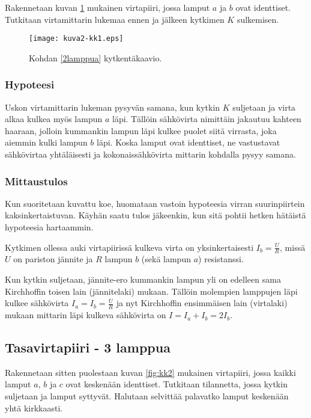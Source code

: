 \documentclass[a4paper,11pt]{article}
\begin{document}
{Rakennetaan kuvan \ref{fig:kk1} mukainen virtapiiri, jossa lamput $a$ ja $b$ ovat identtiset. Tutkitaan virtamittarin lukemaa ennen ja jälkeen kytkimen $K$ sulkemisen.

\begin{figure}[!htb]
    \centering
    \texttt{[image: kuva2-kk1.eps]}
    \caption{Kohdan \ref{2lamppua} kytkentäkaavio.}
    \label{fig:kk1}
\end{figure}

\subsubsection{Hypoteesi}

Uskon virtamittarin lukeman pysyvän samana, kun kytkin $K$ suljetaan ja virta alkaa kulkea myös lampun $a$ läpi. Tällöin sähkövirta nimittäin jakautuu kahteen haaraan, jolloin kummankin lampun läpi kulkee puolet siitä virrasta, joka aiemmin kulki lampun $b$ läpi. Koska lamput ovat identtiset, ne vastustavat sähkövirtaa yhtäläisesti ja kokonaissähkövirta mittarin kohdalla pysyy samana.

\subsubsection{Mittaustulos}

Kun suoritetaan kuvattu koe, huomataan vastoin hypoteesia virran suurinpiirtein kaksinkertaistuvan. Käyhän saatu tulos jäkeenkin, kun sitä pohtii hetken hätäistä hypoteesia hartaammin.

Kytkimen ollessa auki virtapiirissä kulkeva virta on yksinkertaisesti $I_b=\frac{U}{R}$, missä $U$ on pariston jännite ja $R$ lampun $b$ (sekä lampun $a$) resistanssi.

Kun kytkin suljetaan, jännite-ero kummankin lampun yli on edelleen sama Kirchhoffin toisen lain (jännitelaki) mukaan. Tällöin molempien lamppujen läpi kulkee sähkövirta $I_a=I_b=\frac{U}{R}$ ja nyt Kirchhoffin ensimmäisen lain (virtalaki) mukaan mittarin läpi kulkeva sähkövirta on $I=I_a+I_b=2I_b$.

\subsection{Tasavirtapiiri - 3 lamppua}
\label{3lamppua}

Rakennetaan sitten puolestaan kuvan \ref{fig:kk2} mukainen virtapiiri, jossa kaikki lamput $a$, $b$ ja $c$ ovat keskenään identtiset. Tutkitaan tilannetta, jossa kytkin suljetaan ja lamput syttyvät. Halutaan selvittää palavatko lamput keskenään yhtä kirkkaasti.

}
\end{document}
